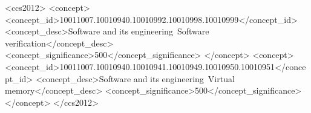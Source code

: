 \documentclass[acmsmall,screen]{acmart}
\begin{document}

\begin{CCSXML}
<ccs2012>
   <concept>
       <concept_id>10011007.10010940.10010992.10010998.10010999</concept_id>
       <concept_desc>Software and its engineering~Software verification</concept_desc>
       <concept_significance>500</concept_significance>
       </concept>
   <concept>
       <concept_id>10011007.10010940.10010941.10010949.10010950.10010951</concept_id>
       <concept_desc>Software and its engineering~Virtual memory</concept_desc>
       <concept_significance>500</concept_significance>
       </concept>
 </ccs2012>
\end{CCSXML}





\maketitle
\end{document}
